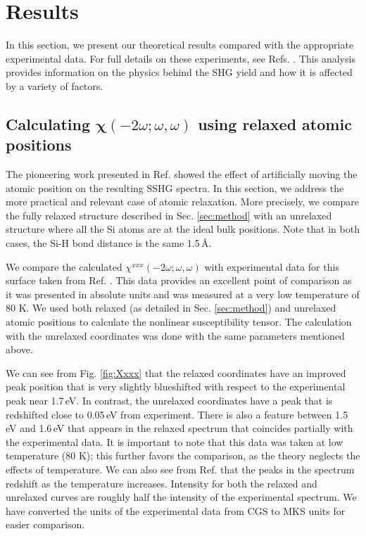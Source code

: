 \section{Results}\label{sec:results}

In this section, we present our theoretical results compared with the
appropriate experimental data. For full details on these experiments, see Refs.
\cite{hoferAPA96, mitchellSS01, mejiaPRB02, bergfeldPRL04}. This analysis
provides information on the physics behind the SHG yield and how it is affected
by a variety of factors.


\subsection{Calculating
\texorpdfstring{$\boldsymbol{\chi}(-2\omega;\omega,\omega)$}{X(-2w;w,w)} using
relaxed atomic positions}\label{sec:relaxed}

The pioneering work presented in Ref. \cite{mejiaPRB02} showed the effect
of artificially moving the atomic position on the resulting SSHG spectra. In
this section, we address the more practical and relevant case of atomic
relaxation. More precisely, we compare the fully relaxed structure described in
Sec. \ref{sec:method} with an unrelaxed structure where all the Si atoms are at
the ideal bulk positions. Note that in both cases, the Si-H bond distance is the
same 1.5\,\AA.

We compare the calculated $\chi^{xxx}(-2\omega;\omega,\omega)$ with experimental
data for this surface taken from Ref. \cite{hoferAPA96}. This data
provides an excellent point of comparison as it was presented in absolute units
and was measured at a very low temperature of 80 K. We used both relaxed (as
detailed in Sec. \ref{sec:method}) and unrelaxed atomic positions to calculate
the nonlinear susceptibility tensor. The calculation with the unrelaxed
coordinates was done with the same parameters mentioned above.

We can see from Fig. \ref{fig:Xxxx} that the relaxed coordinates have an
improved peak position that is very slightly blueshifted with respect to the
experimental peak near 1.7\,eV. In contrast, the unrelaxed coordinates have a
peak that is redshifted close to 0.05\,eV from experiment. There is also a
feature between 1.5\,eV and 1.6\,eV that appears in the relaxed spectrum that
coincides partially with the experimental data. It is important to note that
this data was taken at low temperature (80 K); this further favors the
comparison, as the theory neglects the effects of temperature. We can also see
from Ref. \cite{hoferAPA96} that the peaks in the spectrum redshift as
the temperature increases. Intensity for both the relaxed and unrelaxed curves
are roughly half the intensity of the experimental spectrum. We have converted
the units of the experimental data from CGS to MKS units for easier comparison.

